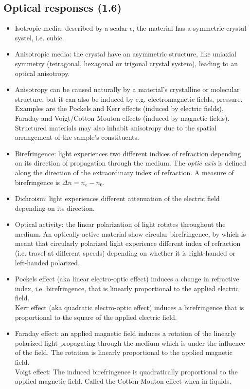 \subsection{Optical responses (1.6)}
\begin{itemize}
    \item Isotropic media: described by a scalar $\epsilon$, the material has a symmetric crystal systel, i.e. cubic.
    
    \item Anisotropic media: the crystal have an asymmetric structure, like uniaxial symmetry (tetragonal, hexagonal or trigonal crystal system), leading to an optical anisotropy.
    
    \item Anisotropy can be caused naturally by a material's crystalline or molecular structure, but it can also be induced by e.g. electromagnetic fields, pressure. Examples are the Pockels and Kerr effects (induced by electric fields), Faraday and Voigt/Cotton-Mouton effects (induced by magnetic fields). Structured materials may also inhabit anisotropy due to the spatial arrangement of the sample's constituents.
    
    \item Birefringence: light experiences two different indices of refraction depending on its direction of propagation through the medium. The \emph{optic axis} is defined along the direction of the extraordinary index of refraction. A measure of birefringence is $\Delta n = n_e - n_0$.
    
    \item Dichroism: light experiences different attenuation of the electric field depending on its direction.
    
    \item Optical activity: the linear polarization of light rotates throughout the medium. An optically active material show circular birefringence, by which is meant that circularly polarized light experience different index of refraction (i.e. travel at different speeds) depending on whether it is right-handed or left-handed polarized.
    
    \item Pockels effect (aka linear electro-optic effect) induces a change in refractive index, i.e. birefringence, that is linearly proportional to the applied electric field. \\
    Kerr effect (aka quadratic electro-optic effect) induces a birefringence that is proportional to the square of the applied electric field.
    
    \item Faraday effect: an applied magnetic field induces a rotation of the linearly polarized light propagating through the medium which is under the influence of the field. The rotation is linearly proportional to the applied magnetic field. \\
    Voigt effect: The induced birefringence is quadratically proportional to the applied magnetic field. Called the Cotton-Mouton effect when in liquids.
    
\end{itemize}

